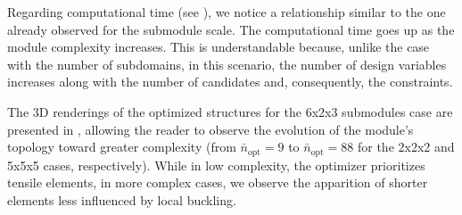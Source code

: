 Regarding computational time (see ), we notice a relationship similar to the one already observed for the submodule scale. The computational time goes up as the module complexity increases. This is understandable because, unlike the case with the number of subdomains, in this scenario, the number of design variables increases along with the number of candidates and, consequently, the constraints.

The 3D renderings of the optimized structures for the 6x2x3 submodules case are presented in , allowing the reader to observe the evolution of the module's topology toward greater complexity (from $\bar{n}_\text{opt}=9$ to $\bar{n}_\text{opt}=88$ for the 2x2x2 and 5x5x5 cases, respectively). While in low complexity, the optimizer prioritizes tensile elements, in more complex cases, we observe the apparition of shorter elements less influenced by local buckling.


